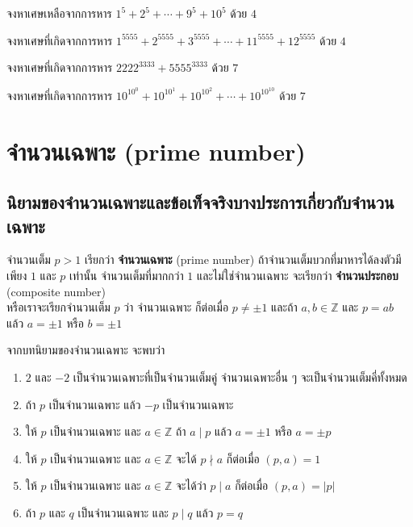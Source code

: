 \begin{examplebox}
	จงหาเศษเหลือจากการหาร $1^5+2^5+\cdots+9^5+10^5$ ด้วย $4$  
\end{examplebox}
\solution   
\newpage

\begin{examplebox}
	จงหาเศษที่เกิดจากการหาร $1^{5555}+2^{5555}+3^{5555}+\cdots+11^{5555}+12^{5555}$ ด้วย $4$
\end{examplebox}
\solution  
\newpage


\begin{examplebox}
	จงหาเศษที่เกิดจากการหาร $2222^{3333}+5555^{3333}$ ด้วย $7$
\end{examplebox}
\solution  
\newpage

\begin{examplebox}
	จงหาเศษที่เกิดจากการหาร $10^{10^0}+10^{10^1}+10^{10^2}+\cdots+10^{10^{10}}$ ด้วย $7$ 
\end{examplebox}
\solution  
\newpage

\section{จำนวนเฉพาะ (prime number)}
\subsection{นิยามของจำนวนเฉพาะและข้อเท็จจริงบางประการเกี่ยวกับจำนวนเฉพาะ}
\begin{definitionbox}
	จำนวนเต็ม $p > 1$ เรียกว่า \textbf{จำนวนเฉพาะ} (prime number) ถ้าจำนวนเต็มบวกที่มาหารได้ลงตัวมีเพียง $1$ และ $p$ เท่านั้น จำนวนเต็มที่มากกว่า $1$ และไม่ใช่จำนวนเฉพาะ จะเรียกว่า \textbf{จำนวนประกอบ} (composite number) \\
	หรือเราจะเรียกจำนวนเต็ม $p$ ว่า จำนวนเฉพาะ ก็ต่อเมื่อ $p \neq \pm 1$ และถ้า $a, b \in \mathbb{Z}$ และ $p = ab$ แล้ว $a = \pm 1$ หรือ $b = \pm 1$
\end{definitionbox}

จากบทนิยามของจำนวนเฉพาะ จะพบว่า
\begin{enumerate}
	\item $2$ และ $-2$ เป็นจำนวนเฉพาะที่เป็นจำนวนเต็มคู่ จำนวนเฉพาะอื่น ๆ จะเป็นจำนวนเต็มคี่ทั้งหมด
	\item ถ้า $p$ เป็นจำนวนเฉพาะ แล้ว $-p$ เป็นจำนวนเฉพาะ
	\item ให้ $p$ เป็นจำนวนเฉพาะ และ $a \in \mathbb{Z}$ ถ้า $a \mid p$ แล้ว $a = \pm 1$ หรือ $a = \pm p$
	\item ให้ $p$ เป็นจำนวนเฉพาะ และ $a \in \mathbb{Z}$ จะได้ $p \nmid a$ ก็ต่อเมื่อ $(p, a) = 1$
	\item ให้ $p$ เป็นจำนวนเฉพาะ และ $a \in \mathbb{Z}$ จะได้ว่า $p \mid a$ ก็ต่อเมื่อ $(p, a) = |p|$
	\item ถ้า $p$ และ $q$ เป็นจำนวนเฉพาะ และ $p \mid q$ แล้ว $p = q$
\end{enumerate}

